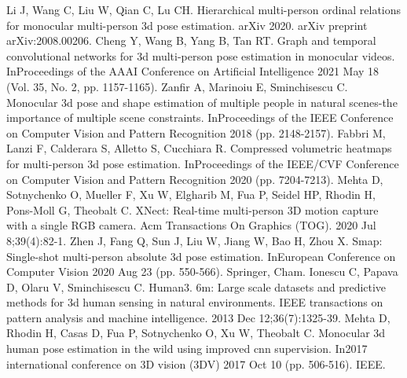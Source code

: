 \documentclass[runningheads]{llncs}
\begin{document}
\begin{thebibliography}{8}
   Li J, Wang C, Liu W, Qian C, Lu CH. Hierarchical multi-person ordinal relations for monocular multi-person 3d pose estimation. arXiv 2020. arXiv preprint arXiv:2008.00206.
   Cheng Y, Wang B, Yang B, Tan RT. Graph and temporal convolutional networks for 3d multi-person pose estimation in monocular videos. InProceedings of the AAAI Conference on Artificial Intelligence 2021 May 18 (Vol. 35, No. 2, pp. 1157-1165).
   Zanfir A, Marinoiu E, Sminchisescu C. Monocular 3d pose and shape estimation of multiple people in natural scenes-the importance of multiple scene constraints. InProceedings of the IEEE Conference on Computer Vision and Pattern Recognition 2018 (pp. 2148-2157).
   Fabbri M, Lanzi F, Calderara S, Alletto S, Cucchiara R. Compressed volumetric heatmaps for multi-person 3d pose estimation. InProceedings of the IEEE/CVF Conference on Computer Vision and Pattern Recognition 2020 (pp. 7204-7213).
   Mehta D, Sotnychenko O, Mueller F, Xu W, Elgharib M, Fua P, Seidel HP, Rhodin H, Pons-Moll G, Theobalt C. XNect: Real-time multi-person 3D motion capture with a single RGB camera. Acm Transactions On Graphics (TOG). 2020 Jul 8;39(4):82-1.
   Zhen J, Fang Q, Sun J, Liu W, Jiang W, Bao H, Zhou X. Smap: Single-shot multi-person absolute 3d pose estimation. InEuropean Conference on Computer Vision 2020 Aug 23 (pp. 550-566). Springer, Cham.
   Ionescu C, Papava D, Olaru V, Sminchisescu C. Human3. 6m: Large scale datasets and predictive methods for 3d human sensing in natural environments. IEEE transactions on pattern analysis and machine intelligence. 2013 Dec 12;36(7):1325-39.
   Mehta D, Rhodin H, Casas D, Fua P, Sotnychenko O, Xu W, Theobalt C. Monocular 3d human pose estimation in the wild using improved cnn supervision. In2017 international conference on 3D vision (3DV) 2017 Oct 10 (pp. 506-516). IEEE.
\end{thebibliography}
\end{document}
